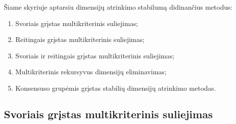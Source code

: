 Šiame skyriuje aptarsiu dimensijų atrinkimo stabilumą didinančius metodus:
\begin{enumerate}
 \item Svoriais grįstas multikriterinis suliejimas;
 \item Reitingais grįstas multikriterinis suliejimas;
 \item Svoriais ir reitingais grįstas multikriterinis suliejimas;
 \item Multikriterinis rekursyvus dimensijų eliminavimas;
 \item Konsensuso grupėmis grįstas stabilių dimensijų atrinkimo metodas.
\end{enumerate}

\subsection{Svoriais grįstas multikriterinis suliejimas}


